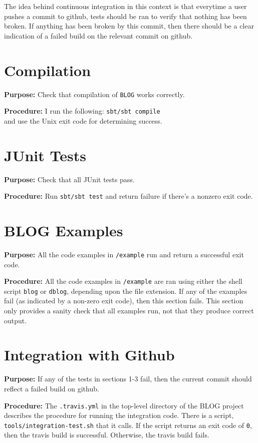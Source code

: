 \documentclass[11pt]{article}
\begin{document}
\maketitle

The idea behind continuous integration in this context is that everytime a user pushes a commit to github, tests should be ran to verify that nothing has been broken. If anything has been broken by this commit, then there should be a clear indication of a failed build on the relevant commit on github.

\section{Compilation}
\textbf{Purpose:} Check that compilation of \texttt{BLOG} works correctly.

\textbf{Procedure:} I run the following: \texttt{sbt/sbt compile} \\
and use the Unix exit code for determining success.

\section{JUnit Tests}
\textbf{Purpose:} Check that all JUnit tests pass.

\textbf{Procedure:} Run \texttt{sbt/sbt test} and return failure if there's a nonzero exit code.

\section{BLOG Examples}

\textbf{Purpose:} All the code examples in \texttt{/example} run and return a successful exit code.

\textbf{Procedure:} All the code examples in \texttt{/example} are ran using either the shell script \texttt{blog} or \texttt{dblog}, depending upon the file extension. If  any of the examples fail (as indicated by a non-zero exit code), then this section fails. This section only provides a sanity check that all examples run, not that they produce correct output.

\section{Integration with Github}

\textbf{Purpose:} If any of the tests in sections 1-3 fail, then the current commit should reflect a failed build on github.

\textbf{Procedure:} The \texttt{.travis.yml} in the top-level directory of the BLOG project describes the procedure for running the integration code. There is a script, \texttt{tools/integration-test.sh} that it calls. If the script returns an exit code of \texttt{0}, then the travis build is successful. Otherwise, the travis build fails.
\end{document}
